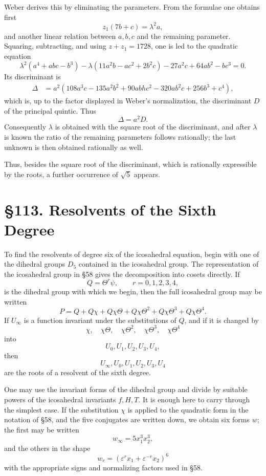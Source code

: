 \documentclass[11pt,a4paper]{book}
\newcommand{\webersection}[2]{\clearpage\section*{\S #1. #2}}
\begin{document}
Weber derives this by eliminating the parameters.  From the formulae one obtains first
\begin{equation}
 z_1(7b+c)=\lambda^2 a,
\end{equation}
and another linear relation between $a,b,c$ and the remaining parameter.  Squaring, subtracting, and using $z+z_1=1728$, one is led to the quadratic equation
\begin{equation}
 \lambda^2(a^4+abc-b^3)-\lambda(11a^2b-ac^2+2b^2c)
      -27a^2c+64ab^2-bc^3=0.
\end{equation}
Its discriminant is
\begin{align}
 \Delta&=a^2(108a^3c-135a^2b^2+90abhc^2-320ab^2c+256b^3+c^4),
\end{align}
which is, up to the factor displayed in Weber's normalization, the discriminant $D$ of the principal quintic.  Thus
\begin{equation}
 \Delta=a^2D.
\end{equation}
Consequently $\lambda$ is obtained with the square root of the discriminant, and after $\lambda$ is known the ratio of the remaining parameters follows rationally; the last unknown is then obtained rationally as well.

Thus, besides the square root of the discriminant, which is rationally expressible by the roots, a further occurrence of $\sqrt5$ appears.

\webersection{113}{Resolvents of the Sixth Degree}

To find the resolvents of degree six of the icosahedral equation, begin with one of the dihedral groups $D_5$ contained in the icosahedral group.  The representation of the icosahedral group in \S 58 gives the decomposition into cosets directly.  If
\begin{equation}
 Q=\Theta^r\psi,
 \qquad r=0,1,2,3,4,
\end{equation}
is the dihedral group with which we begin, then the full icosahedral group may be written
\begin{equation}
 P=Q+Q\chi+Q\chi\Theta+Q\chi\Theta^2+Q\chi\Theta^3+Q\chi\Theta^4.
\end{equation}
If $U_\infty$ is a function invariant under the substitutions of $Q$, and if it is changed by
\[
 \chi,\quad \chi\Theta,
 \quad\chi\Theta^2,
 \quad\chi\Theta^3,
 \quad\chi\Theta^4
\]
into
\[
 U_0,U_1,U_2,U_3,U_4,
\]
then
\[
 U_\infty,U_0,U_1,U_2,U_3,U_4
\]
are the roots of a resolvent of the sixth degree.

One may use the invariant forms of the dihedral group and divide by suitable powers of the icosahedral invariants $f,H,T$.  It is enough here to carry through the simplest case.  If the substitution $\chi$ is applied to the quadratic form in the notation of \S 58, and the five conjugates are written down, we obtain six forms $w$; the first may be written
\begin{equation}
 w_\infty=5x_1^3x_2^3,
\end{equation}
and the others in the shape
\begin{equation}
 w_r=(\varepsilon^r x_1+\varepsilon^{-r}x_2)^6
\end{equation}
with the appropriate signs and normalizing factors used in \S 58.
\end{document}
